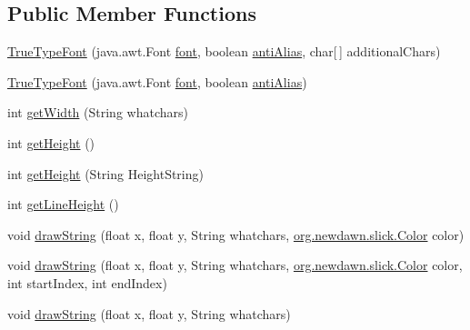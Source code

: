 \subsection*{Public Member Functions}
\begin{DoxyCompactItemize}
\item 
\mbox{\hyperlink{classorg_1_1newdawn_1_1slick_1_1_true_type_font_affbebba5345c77b20cec3af40a878170}{True\+Type\+Font}} (java.\+awt.\+Font \mbox{\hyperlink{classorg_1_1newdawn_1_1slick_1_1_true_type_font_a7c0b002b6010aa855bf4391ecf749498}{font}}, boolean \mbox{\hyperlink{classorg_1_1newdawn_1_1slick_1_1_true_type_font_a1dc8e98ba06633544ec9f69c434dc126}{anti\+Alias}}, char\mbox{[}$\,$\mbox{]} additional\+Chars)
\item 
\mbox{\hyperlink{classorg_1_1newdawn_1_1slick_1_1_true_type_font_a8e2f2993f972ca7a18e47297f9ee12e4}{True\+Type\+Font}} (java.\+awt.\+Font \mbox{\hyperlink{classorg_1_1newdawn_1_1slick_1_1_true_type_font_a7c0b002b6010aa855bf4391ecf749498}{font}}, boolean \mbox{\hyperlink{classorg_1_1newdawn_1_1slick_1_1_true_type_font_a1dc8e98ba06633544ec9f69c434dc126}{anti\+Alias}})
\item 
int \mbox{\hyperlink{classorg_1_1newdawn_1_1slick_1_1_true_type_font_ad5614f14f3194de0b68f9fe095ab0bfa}{get\+Width}} (String whatchars)
\item 
int \mbox{\hyperlink{classorg_1_1newdawn_1_1slick_1_1_true_type_font_ab2097e844d68fb72890b12db859493d7}{get\+Height}} ()
\item 
int \mbox{\hyperlink{classorg_1_1newdawn_1_1slick_1_1_true_type_font_a077395a15b52dd9b4831b3ce8d6c8430}{get\+Height}} (String Height\+String)
\item 
int \mbox{\hyperlink{classorg_1_1newdawn_1_1slick_1_1_true_type_font_a16d8fe4babd9423e3cc197662889faaf}{get\+Line\+Height}} ()
\item 
void \mbox{\hyperlink{classorg_1_1newdawn_1_1slick_1_1_true_type_font_a348f5304a388040ffe1d87b2f17487de}{draw\+String}} (float x, float y, String whatchars, \mbox{\hyperlink{classorg_1_1newdawn_1_1slick_1_1_color}{org.\+newdawn.\+slick.\+Color}} color)
\item 
void \mbox{\hyperlink{classorg_1_1newdawn_1_1slick_1_1_true_type_font_a6b7a0c70c011517ac5dc2bc498516120}{draw\+String}} (float x, float y, String whatchars, \mbox{\hyperlink{classorg_1_1newdawn_1_1slick_1_1_color}{org.\+newdawn.\+slick.\+Color}} color, int start\+Index, int end\+Index)
\item 
void \mbox{\hyperlink{classorg_1_1newdawn_1_1slick_1_1_true_type_font_a732f297676331fd0ac0bd802a733d8c2}{draw\+String}} (float x, float y, String whatchars)
\end{DoxyCompactItemize}
